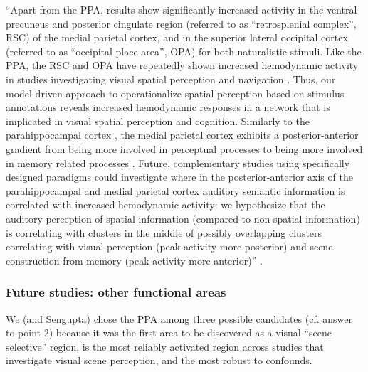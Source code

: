 ``Apart from the PPA, results show significantly increased activity in the
ventral precuneus and posterior cingulate region (referred to as ``retrosplenial
complex'', RSC) of the medial parietal cortex, and in the superior lateral
occipital cortex (referred to as ``occipital place area'', OPA) for both
naturalistic stimuli.
Like the PPA, the RSC and OPA have repeatedly  shown increased hemodynamic
activity in studies investigating visual spatial perception and navigation
\citep{chrastil2018heterogeneity, bettencourt2013role, dilks2013occipital,
epstein2019scene}.
Thus, our model-driven approach to operationalize spatial perception based on
stimulus annotations reveals increased hemodynamic responses in a network that
is implicated in visual spatial perception and cognition.
Similarly to the parahippocampal cortex \citep{aminoff2013role}, the medial
parietal cortex exhibits a posterior-anterior gradient from being more involved
in perceptual processes to being more involved in memory related processes
\citep{chrastil2018heterogeneity, hassabis2009construction, silson2019posterior,
steel2021network}.
Future, complementary studies using specifically designed paradigms could
investigate where in the posterior-anterior axis of the parahippocampal and
medial parietal cortex auditory semantic information is correlated with
increased hemodynamic activity:
we hypothesize that the auditory perception of spatial information (compared to
non-spatial information) is correlating with clusters in the middle of possibly
overlapping clusters correlating with visual perception (peak activity more
posterior) and scene construction from memory (peak activity more anterior)''
\citep{haeusler2022processing}.



\subsubsection{Future studies: other functional areas}


We (and Sengupta) chose the PPA among three possible candidates (cf. answer to
point 2) because it was the first area to be discovered as a visual
“scene-selective” region, is the most reliably activated region across studies
that investigate visual scene perception, and the most robust to confounds.

